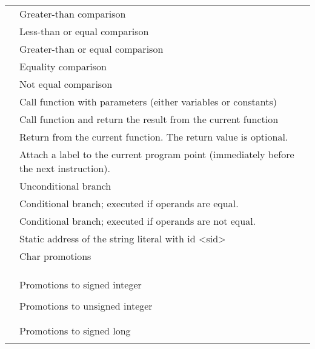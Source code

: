 \documentclass[../00-main.tex]{subfiles}
\begin{document}
\begin{xltabular}{\textwidth}{lX}
 & Greater-than comparison \\
 & Less-than or equal comparison \\
 & Greater-than or equal comparison \\
 & Equality comparison \\
 & Not equal comparison \\
\midrule
{} & Call function  with parameters  (either variables or constants) \\
 & Call function  and return the result from the current function \\
 & Return from the current function. The return value  is optional. \\
\midrule
{} & Attach a label to the current program point (immediately before the next instruction). \\
 & Unconditional branch \\
 & Conditional branch; executed if operands are equal. \\
 & Conditional branch; executed if operands are not equal. \\
\midrule
{} & Static address of the string literal with id <sid> \\
\midrule
{} & Char promotions \\
 &  \\
 &  \\
 &  \\
\midrule
{} & Promotions to signed integer \\
 &  \\
\midrule
{} & Promotions to unsigned integer \\
 &  \\
 &  \\
\midrule
{} & Promotions to signed long \\
 &  \\
\midrule

\end{xltabular}
\end{document}
